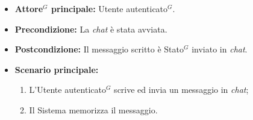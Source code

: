 \label{usecase:Invio messaggio chat}
\begin{itemize}
	\item \textbf{\gls{Attore}$^G$ principale:} \gls{Utente autenticato}$^G$.

	\item \textbf{Precondizione:} La \textit{chat} è stata avviata.


	\item \textbf{Postcondizione:} Il messaggio scritto è \gls{Stato}$^G$ inviato in \textit{chat}.

	\item \textbf{Scenario principale:}
	      \begin{enumerate}
		      \item L'\gls{Utente autenticato}$^G$ scrive ed invia un messaggio in \textit{chat};
		      \item Il Sistema memorizza il messaggio.
	      \end{enumerate}
\end{itemize}
